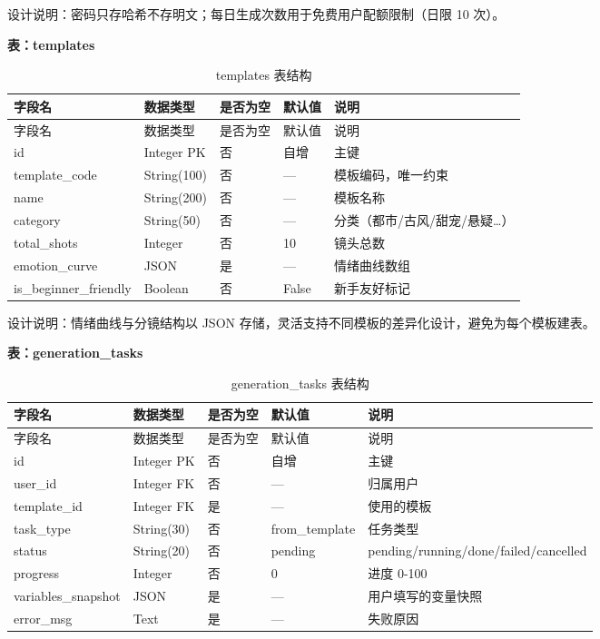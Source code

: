 \documentclass[12pt]{ctexrep}
\begin{document}
设计说明：密码只存哈希不存明文；每日生成次数用于免费用户配额限制（日限 10 次）。

\textbf{表：templates}

\begin{longtable}{p{3.6cm}p{3.2cm}p{1.6cm}p{1.8cm}p{4.8cm}}
\caption{templates 表结构}\label{tab:templates}\\
\toprule
字段名 & 数据类型 & 是否为空 & 默认值 & 说明\\
\midrule
\endfirsthead
\toprule
字段名 & 数据类型 & 是否为空 & 默认值 & 说明\\
\midrule
\endhead
id & Integer PK & 否 & 自增 & 主键\\
template\_code & String(100) & 否 & — & 模板编码，唯一约束\\
name & String(200) & 否 & — & 模板名称\\
category & String(50) & 否 & — & 分类（都市/古风/甜宠/悬疑…）\\
total\_shots & Integer & 否 & 10 & 镜头总数\\
emotion\_curve & JSON & 是 & — & 情绪曲线数组\\
is\_beginner\_friendly & Boolean & 否 & False & 新手友好标记\\
\bottomrule
\end{longtable}

设计说明：情绪曲线与分镜结构以 JSON 存储，灵活支持不同模板的差异化设计，避免为每个模板建表。

\textbf{表：generation\_tasks}

\begin{longtable}{p{3.8cm}p{3.4cm}p{1.6cm}p{1.8cm}p{4.4cm}}
\caption{generation\_tasks 表结构}\label{tab:gen}\\
\toprule
字段名 & 数据类型 & 是否为空 & 默认值 & 说明\\
\midrule
\endfirsthead
\toprule
字段名 & 数据类型 & 是否为空 & 默认值 & 说明\\
\midrule
\endhead
id & Integer PK & 否 & 自增 & 主键\\
user\_id & Integer FK & 否 & — & 归属用户\\
template\_id & Integer FK & 是 & — & 使用的模板\\
task\_type & String(30) & 否 & from\_template & 任务类型\\
status & String(20) & 否 & pending & pending/running/done/failed/cancelled\\
progress & Integer & 否 & 0 & 进度 0-100\\
variables\_snapshot & JSON & 是 & — & 用户填写的变量快照\\
error\_msg & Text & 是 & — & 失败原因\\
\bottomrule
\end{longtable}
\end{document}

